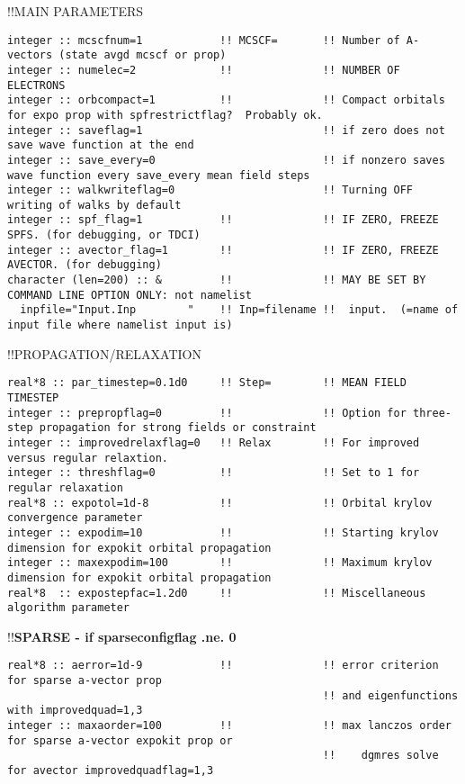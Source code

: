 !!{\large \quad MAIN PARAMETERS }
\begin{verbatim}
integer :: mcscfnum=1            !! MCSCF=       !! Number of A-vectors (state avgd mcscf or prop)
integer :: numelec=2             !!              !! NUMBER OF ELECTRONS
integer :: orbcompact=1          !!              !! Compact orbitals for expo prop with spfrestrictflag?  Probably ok.
integer :: saveflag=1                            !! if zero does not save wave function at the end
integer :: save_every=0                          !! if nonzero saves wave function every save_every mean field steps
integer :: walkwriteflag=0                       !! Turning OFF writing of walks by default
integer :: spf_flag=1            !!              !! IF ZERO, FREEZE SPFS. (for debugging, or TDCI)
integer :: avector_flag=1        !!              !! IF ZERO, FREEZE AVECTOR. (for debugging)
character (len=200) :: &         !!              !! MAY BE SET BY COMMAND LINE OPTION ONLY: not namelist
  inpfile="Input.Inp        "    !! Inp=filename !!  input.  (=name of input file where namelist input is)
\end{verbatim}
!!{\large \quad PROPAGATION/RELAXATION}
\begin{verbatim}
real*8 :: par_timestep=0.1d0     !! Step=        !! MEAN FIELD TIMESTEP
integer :: prepropflag=0         !!              !! Option for three-step propagation for strong fields or constraint
integer :: improvedrelaxflag=0   !! Relax        !! For improved versus regular relaxtion.   
integer :: threshflag=0          !!              !! Set to 1 for regular relaxation
real*8 :: expotol=1d-8           !!              !! Orbital krylov convergence parameter
integer :: expodim=10            !!              !! Starting krylov dimension for expokit orbital propagation
integer :: maxexpodim=100        !!              !! Maximum krylov dimension for expokit orbital propagation
real*8  :: expostepfac=1.2d0     !!              !! Miscellaneous algorithm parameter
\end{verbatim}
!!\textbf{\qquad SPARSE - if sparseconfigflag .ne. 0}
\begin{verbatim}
real*8 :: aerror=1d-9            !!              !! error criterion for sparse a-vector prop
                                                 !! and eigenfunctions with improvedquad=1,3
integer :: maxaorder=100         !!              !! max lanczos order for sparse a-vector expokit prop or
                                                 !!    dgmres solve for avector improvedquadflag=1,3
\end{verbatim}

